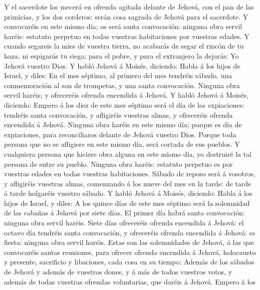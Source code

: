  Y el sacerdote los mecerá en ofrenda agitada delante de
Jehová, con el pan de las primicias, y los dos corderos: serán cosa
sagrada de Jehová para el sacerdote.  Y convocaréis en
este mismo día; os será santa convocación: ninguna obra servil haréis:
estatuto perpetuo en todas vuestras habitaciones por vuestras edades.
 Y cuando segareis la mies de vuestra tierra, no acabarás
de segar el rincón de tu haza, ni espigarás tu siega; para el pobre, y
para el extranjero la dejarás: Yo Jehová vuestro Dios.  Y
habló Jehová á Moisés, diciendo:  Habla á los hijos de
Israel, y diles: En el mes séptimo, al primero del mes tendréis sábado,
una conmemoración al son de trompetas, y una santa convocación.
 Ninguna obra servil haréis; y ofreceréis ofrenda
encendida á Jehová.  Y habló Jehová á Moisés, diciendo:
 Empero á los diez de este mes séptimo será el día de las
expiaciones: tendréis santa convocación, y afligiréis vuestras almas, y
ofreceréis ofrenda encendida á Jehová.  Ninguna obra
haréis en este mismo día; porque es día de expiaciones, para
reconciliaros delante de Jehová vuestro Dios.  Porque
toda persona que no se afligiere en este mismo día, será cortada de sus
pueblos.  Y cualquiera persona que hiciere obra alguna en
este mismo día, yo destruiré la tal persona de entre su pueblo.
 Ninguna obra haréis: estatuto perpetuo es por vuestras
edades en todas vuestras habitaciones.  Sábado de reposo
será á vosotros, y afligiréis vuestras almas, comenzando á los nueve del
mes en la tarde: de tarde á tarde holgaréis vuestro sábado.
 Y habló Jehová á Moisés, diciendo:  Habla
á los hijos de Israel, y diles: A los quince días de este mes séptimo
será la solemnidad de las cabañas á Jehová por siete días.
 El primer día habrá santa convocación: ninguna obra
servil haréis.  Siete días ofreceréis ofrenda encendida á
Jehová: el octavo día tendréis santa convocación, y ofreceréis ofrenda
encendida á Jehová: es fiesta: ninguna obra servil haréis.
 Estas son las solemnidades de Jehová, á las que
convocaréis santas reuniones, para ofrecer ofrenda encendida á Jehová,
holocausto y presente, sacrificio y libaciones, cada cosa en su tiempo:
 Además de los sábados de Jehová y además de vuestros
dones, y á más de todos vuestros votos, y además de todas vuestras
ofrendas voluntarias, que daréis á Jehová.  Empero á los
